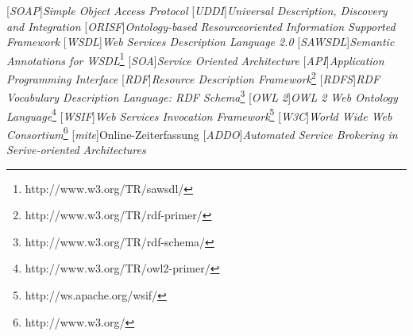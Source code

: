 
[\emph{SOAP}]{\emph{Simple Object Access Protocol}}
[\emph{UDDI}]{\emph{Universal Description, Discovery and Integration}}
[\emph{ORISF}]{\emph{Ontology-based Resourceoriented Information Supported Framework}}
[\emph{WSDL}]{\emph{Web Services Description Language 2.0}}
[\emph{SAWSDL}]{\emph{Semantic Annotations for WSDL}\footnote{http://www.w3.org/TR/sawsdl/}}
[\emph{SOA}]{\emph{Service Oriented Architecture}}
[\emph{API}]{\emph{Application Programming Interface}}
[\emph{RDF}]{\emph{Resource Description Framework}\footnote{http://www.w3.org/TR/rdf-primer/}}
[\emph{RDFS}]{\emph{RDF Vocabulary Description Language: RDF Schema}\footnote{http://www.w3.org/TR/rdf-schema/}}
[\emph{OWL 2}]{\emph{OWL 2 Web Ontology Language}\footnote{http://www.w3.org/TR/owl2-primer/}}
[\emph{WSIF}]{\emph{Web Services Invocation Framework}\footnote{http://ws.apache.org/wsif/}}
[\emph{W3C}]{\emph{World Wide Web Consortium}\footnote{http://www.w3.org/}}
[\emph{mite}]{Online-Zeiterfassung}
[\emph{ADDO}]{\emph{Automated Service Brokering in Serive-oriented Architectures}}


\newcommand{\restapi}{\emph{RESTful} \ac{API} }
\newcommand{\restapis}{\emph{RESTful} \ac{API}\emph{s} }